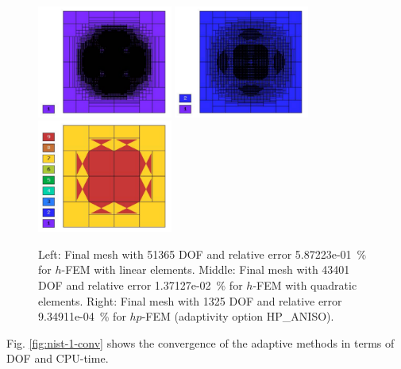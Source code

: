 \documentclass[12pt]{elsarticle}
\begin{document}
\begin{figure}[!ht]
\centering
\includegraphics[height=3.7cm]{mafig2.pdf}
\includegraphics[height=3.7cm]{mafig3.pdf}
\includegraphics[height=3.7cm]{mafig4.pdf}
\caption{
Left: Final mesh with 51365 DOF and relative error 5.87223e-01~\% for $h$-FEM with linear elements.
Middle: Final mesh with 43401 DOF and relative error 1.37127e-02~\% for $h$-FEM with quadratic elements.
Right: Final mesh with 1325 DOF and relative error 9.34911e-04~\% for $hp$-FEM (adaptivity option HP\_ANISO).}
\label{fig:nist-1-hp-aniso}
\end{figure}

Fig. \ref{fig:nist-1-conv} shows the convergence of the adaptive methods in terms of DOF and CPU-time.
\end{document}

